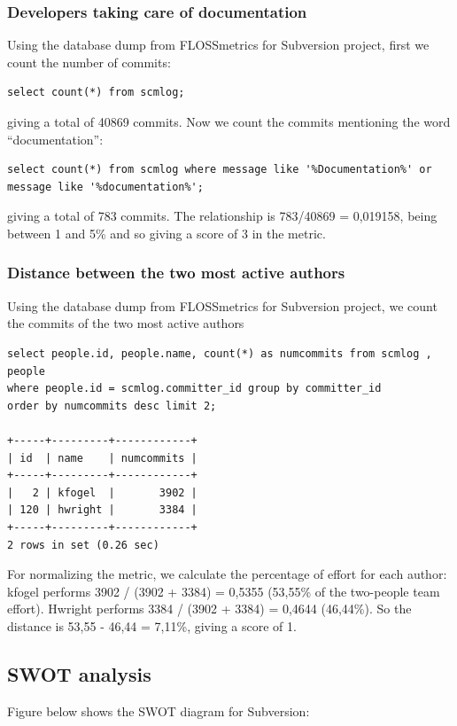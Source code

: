 \documentclass[a4paper,10pt]{article}
\begin{document}
\subsubsection{Developers taking care of documentation}

Using the database dump from FLOSSmetrics for Subversion project, first we count the number of commits:
\begin{verbatim}
select count(*) from scmlog;
\end{verbatim}
giving a total of 40869 commits.
Now we count the commits mentioning the word ``documentation'':
\begin{verbatim}
select count(*) from scmlog where message like '%Documentation%' or message like '%documentation%';
\end{verbatim}
giving a total of 783 commits.
The relationship is 783/40869 = 0,019158, being between 1 and 5\% and so giving a score of 3 in the metric.

\subsubsection{Distance between the two most active authors}
Using the database dump from FLOSSmetrics for Subversion project, we count the commits of the two most active authors

\begin{verbatim}
select people.id, people.name, count(*) as numcommits from scmlog , people 
where people.id = scmlog.committer_id group by committer_id 
order by numcommits desc limit 2;

+-----+---------+------------+
| id  | name    | numcommits |
+-----+---------+------------+
|   2 | kfogel  |       3902 |
| 120 | hwright |       3384 |
+-----+---------+------------+
2 rows in set (0.26 sec)
\end{verbatim}

For normalizing the metric, we calculate the percentage of effort for each author: kfogel performs 3902 / (3902 + 3384) = 0,5355 (53,55\% of the two-people team effort). Hwright performs 3384 / (3902 + 3384) = 0,4644 (46,44\%). So the distance is 53,55 - 46,44 = 7,11\%, giving a score of 1.

\subsection{SWOT analysis}

Figure below shows the SWOT\cite{swot_analysis} diagram for Subversion: 
\end{document}
